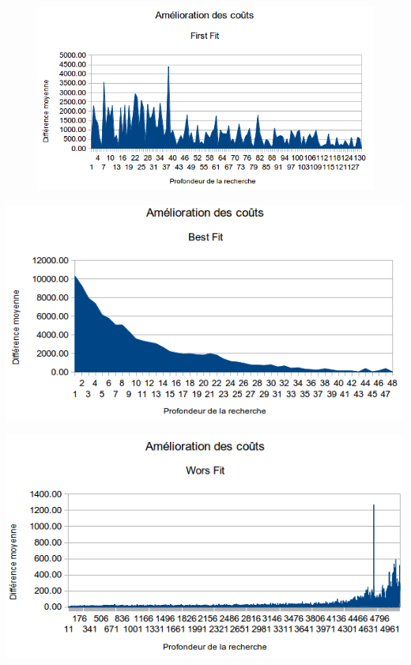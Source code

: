 \documentclass[a4paper,10pt]{report}
\begin{document}
\begin{figure}[h]
  \begin{center}
    \includegraphics[width=\textwidth]{images/att48-cost-first-fit.png}
  \end{center}
\end{figure}


\begin{center}
  \includegraphics[width=\textwidth]{images/att48-cost-best-fit.png}
\end{center}

\begin{center}
  \includegraphics[width=\textwidth]{images/att48-cost-worst-fit.png}
\end{center}
\end{document}
